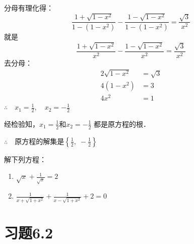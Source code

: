 \begin{solution}
    分母有理化得：
\[\frac{1+\sqrt{1-x^2}}{1-(1-x^2)}-\frac{1-\sqrt{1-x^2}}{1-(1-x^2)}=\frac{\sqrt{3}}{x^2}\]
就是
\[\frac{1+\sqrt{1-x^2}}{x^2}-\frac{1-\sqrt{1-x^2}}{x^2}=\frac{\sqrt{3}}{x^2}\]
去分母：
\[\begin{split}
    2\sqrt{1-x^2}&= \sqrt{3}\\
    4(1-x^2)&=3\\
    4x^2&=1
\end{split}\]
$\therefore\quad x_1=\frac{1}{2},\quad x_2=-\frac{1}{2}$

经检验知，$x_1=\frac{1}{2}$和$x_2=-\frac{1}{2}$
都是原方程的根．

$\therefore\quad $原方程的解集是$\left\{\frac{1}{2},\; -\frac{1}{2}\right\}$
\end{solution}

\begin{ex}
    解下列方程：
\begin{enumerate}
    \item $\sqrt{x}+\frac{1}{\sqrt{x}}=2$
    \item $\frac{1}{x+\sqrt{1+x^2}}+\frac{1}{x-\sqrt{1+x^2}}+2=0$
\end{enumerate}
\end{ex}



\section*{习题6.2}

